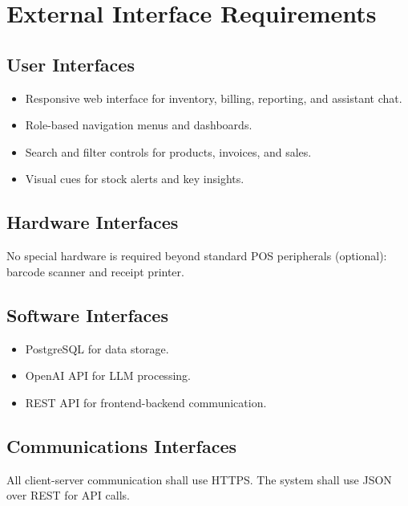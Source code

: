 \section{External Interface Requirements}
\subsection{User Interfaces}
\begin{itemize}
    \item Responsive web interface for inventory, billing, reporting, and assistant chat.
    \item Role-based navigation menus and dashboards.
    \item Search and filter controls for products, invoices, and sales.
    \item Visual cues for stock alerts and key insights.
\end{itemize}

\subsection{Hardware Interfaces}
No special hardware is required beyond standard POS peripherals (optional): barcode scanner and receipt printer.

\subsection{Software Interfaces}
\begin{itemize}
    \item PostgreSQL for data storage.
    \item OpenAI API for LLM processing.
    \item REST API for frontend-backend communication.
\end{itemize}

\subsection{Communications Interfaces}
All client-server communication shall use HTTPS. The system shall use JSON over REST for API calls.
